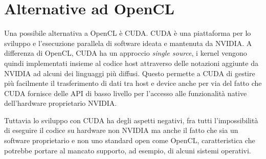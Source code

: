 \section{Alternative ad OpenCL}
Una possibile alternativa a OpenCL è CUDA\cite{cuda}. CUDA è una piattaforma per lo sviluppo e l'esecuzione parallela di software ideata e mantenuta da NVIDIA.
A differenza di OpenCL, CUDA ha un approccio \textit{single source}, i kernel vengono quindi implementati insieme al codice host attraverso delle notazioni aggiunte da NVIDIA ad alcuni dei linguaggi più diffusi. Questo permette a CUDA di gestire più facilmente il trasferimento di dati tra host e device anche per via del fatto che CUDA fornisce delle API di basso livello per l'accesso alle funzionalità native dell'hardware proprietario NVIDIA.

Tuttavia lo sviluppo con CUDA ha degli aspetti negativi, fra tutti l'impossibilità di eseguire il codice su hardware non NVIDIA ma anche il fatto che sia un software proprietario e non uno standard open come OpenCL, caratteristica che potrebbe portare al mancato supporto, ad esempio, di alcuni sistemi operativi.